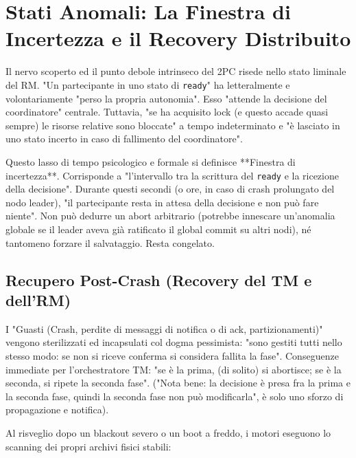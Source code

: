 \section{Stati Anomali: La Finestra di Incertezza e il Recovery Distribuito}

Il nervo scoperto ed il punto debole intrinseco del 2PC risede nello stato liminale del RM.
"Un partecipante in uno stato di \texttt{ready}" ha letteralmente e volontariamente "perso la propria autonomia". Esso "attende la decisione del coordinatore" centrale.
Tuttavia, "se ha acquisito lock (e questo accade quasi sempre) le risorse relative sono bloccate" a tempo indeterminato e "è lasciato in uno stato incerto in caso di fallimento del coordinatore".

Questo lasso di tempo psicologico e formale si definisce **Finestra di incertezza**. Corrisponde a "l'intervallo tra la scrittura del \texttt{ready} e la ricezione della decisione". Durante questi secondi (o ore, in caso di crash prolungato del nodo leader), "il partecipante resta in attesa della decisione e non può fare niente". Non può dedurre un abort arbitrario (potrebbe innescare un'anomalia globale se il leader aveva già ratificato il global commit su altri nodi), né tantomeno forzare il salvataggio. Resta congelato.

\subsection{Recupero Post-Crash (Recovery del TM e dell'RM)}
I "Guasti (Crash, perdite di messaggi di notifica o di ack, partizionamenti)" vengono sterilizzati ed incapsulati col dogma pessimista: "sono gestiti tutti nello stesso modo: se non si riceve conferma si considera fallita la fase".
Conseguenze immediate per l'orchestratore TM: "se è la prima, (di solito) si abortisce; se è la seconda, si ripete la seconda fase". ("Nota bene: la decisione è presa fra la prima e la seconda fase, quindi la seconda fase non può modificarla", è solo uno sforzo di propagazione e notifica).

Al risveglio dopo un blackout severo o un boot a freddo, i motori eseguono lo scanning dei propri archivi fisici stabili:

